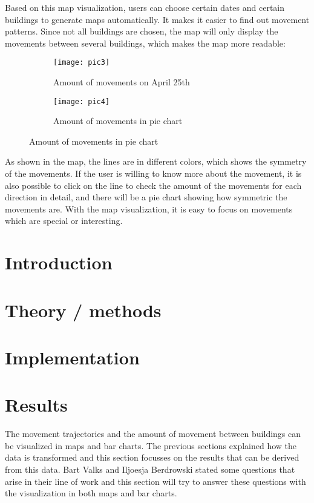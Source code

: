 Based on this map visualization, users can choose certain dates and certain buildings to generate maps automatically. It makes it easier to find out movement patterns. Since not all buildings are chosen, the map will only display the movements between several buildings, which makes the map more readable:

\begin{figure}[H]
	\centering
	\captionsetup[subfigure]{justification=centering}
	\begin{subfigure}[t]{0.48\textwidth}
	\texttt{[image: pic3]}
	\caption{Amount of movements on April 25th}
	\end{subfigure}
	\begin{subfigure}[t]{0.48\textwidth}
	\texttt{[image: pic4]}
	\caption{Amount of movements in pie chart}
	\end{subfigure}
\end{figure}

As shown in the map, the lines are in different colors, which shows the symmetry of the movements. If the user is willing to know more about the movement, it is also possible to click on the line to check the amount of the movements for each direction in detail, and there will be a pie chart showing how symmetric the movements are. With the map visualization, it is easy to focus on movements which are special or interesting.

\section{Introduction}
\section{Theory / methods}
\section{Implementation}
\section{Results}\label{results}

The movement trajectories and the amount of movement between buildings can be visualized in maps and bar charts. The previous sections explained how the data is transformed and this section focusses on the results that can be derived from this data. Bart Valks and Iljoesja Berdrowski stated some questions that arise in their line of work and this section will try to answer these questions with the visualization in both maps and bar charts.

